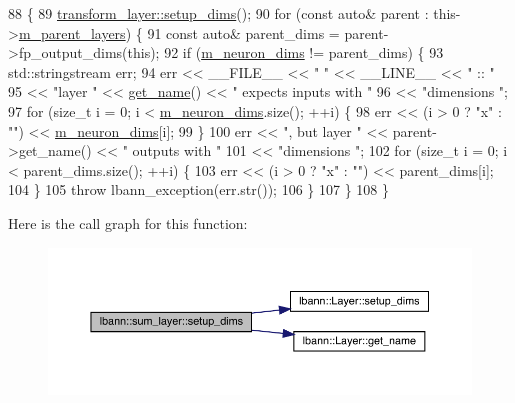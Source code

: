 \begin{DoxyCode}
88                              \{
89     \hyperlink{classlbann_1_1Layer_a90fce1b06c1f2abb480e18cfe08a9746}{transform\_layer::setup\_dims}();
90     \textcolor{keywordflow}{for} (\textcolor{keyword}{const} \textcolor{keyword}{auto}& parent : this->\hyperlink{classlbann_1_1Layer_a3fa7c6cf1a22bb14ab0e85e3dc6027c5}{m\_parent\_layers}) \{
91       \textcolor{keyword}{const} \textcolor{keyword}{auto}& parent\_dims = parent->fp\_output\_dims(\textcolor{keyword}{this});
92       \textcolor{keywordflow}{if} (\hyperlink{classlbann_1_1Layer_abb34bb8031f57a483e2e327a5f229f48}{m\_neuron\_dims} != parent\_dims) \{
93         std::stringstream err;
94         err << \_\_FILE\_\_ << \textcolor{stringliteral}{" "} << \_\_LINE\_\_ << \textcolor{stringliteral}{" :: "}
95             << \textcolor{stringliteral}{"layer "} << \hyperlink{classlbann_1_1Layer_a80027550202fa7dbb1dd55fa8a66c84b}{get\_name}() << \textcolor{stringliteral}{" expects inputs with "}
96             << \textcolor{stringliteral}{"dimensions "};
97         \textcolor{keywordflow}{for} (\textcolor{keywordtype}{size\_t} i = 0; i < \hyperlink{classlbann_1_1Layer_abb34bb8031f57a483e2e327a5f229f48}{m\_neuron\_dims}.size(); ++i) \{
98           err << (i > 0 ? \textcolor{stringliteral}{"x"} : \textcolor{stringliteral}{""}) << \hyperlink{classlbann_1_1Layer_abb34bb8031f57a483e2e327a5f229f48}{m\_neuron\_dims}[i];
99         \}
100         err << \textcolor{stringliteral}{", but layer "} << parent->get\_name() << \textcolor{stringliteral}{" outputs with "}
101             << \textcolor{stringliteral}{"dimensions "};
102         \textcolor{keywordflow}{for} (\textcolor{keywordtype}{size\_t} i = 0; i < parent\_dims.size(); ++i) \{
103           err << (i > 0 ? \textcolor{stringliteral}{"x"} : \textcolor{stringliteral}{""}) << parent\_dims[i];
104         \}
105         \textcolor{keywordflow}{throw} lbann\_exception(err.str());
106       \}
107     \}
108   \}
\end{DoxyCode}
Here is the call graph for this function\+:\nopagebreak
\begin{figure}[H]
\begin{center}
\leavevmode
\includegraphics[width=350pt]{classlbann_1_1sum__layer_af7e011a8e1cd89cc9f9c0224182bfb7a_cgraph}
\end{center}
\end{figure}


